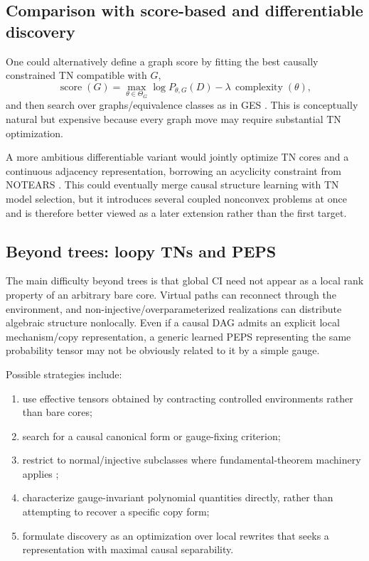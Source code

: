 \documentclass[11pt]{article}
\theoremstyle{remark}
\begin{document}
\subsection{Comparison with score-based and differentiable discovery}

One could alternatively define a graph score by fitting the best causally constrained TN compatible with $G$,
\begin{equation}
\operatorname{score}(G)=\max_{\theta\in\Theta_G}\log P_{\theta,G}(D)-\lambda\,\operatorname{complexity}(\theta),
\end{equation}
and then search over graphs/equivalence classes as in GES \cite{chickering2002optimal}. This is conceptually natural but expensive because every graph move may require substantial TN optimization.

A more ambitious differentiable variant would jointly optimize TN cores and a continuous adjacency representation, borrowing an acyclicity constraint from NOTEARS \cite{zheng2018notears}. This could eventually merge causal structure learning with TN model selection, but it introduces several coupled nonconvex problems at once and is therefore better viewed as a later extension rather than the first target.

\subsection{Beyond trees: loopy TNs and PEPS}

The main difficulty beyond trees is that global CI need not appear as a local rank property of an arbitrary bare core. Virtual paths can reconnect through the environment, and non-injective/overparameterized realizations can distribute algebraic structure nonlocally. Even if a causal DAG admits an explicit local mechanism/copy representation, a generic learned PEPS representing the same probability tensor may not be obviously related to it by a simple gauge.

Possible strategies include:
\begin{enumerate}
\item use effective tensors obtained by contracting controlled environments rather than bare cores;
\item search for a causal canonical form or gauge-fixing criterion;
\item restrict to normal/injective subclasses where fundamental-theorem machinery applies \cite{molnar2018normal};
\item characterize gauge-invariant polynomial quantities directly, rather than attempting to recover a specific copy form;
\item formulate discovery as an optimization over local rewrites that seeks a representation with maximal causal separability.
\end{enumerate}
\end{document}
